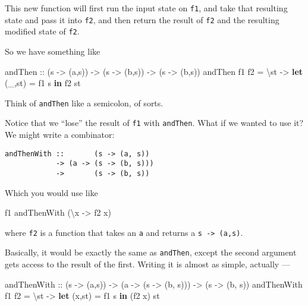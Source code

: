 \documentclass[]{article}
\newenvironment{Shaded}{}{}
\newcommand{\KeywordTok}[1]{\textcolor[rgb]{0.00,0.44,0.13}{\textbf{#1}}}
\newcommand{\NormalTok}[1]{#1}
\newcommand{\OtherTok}[1]{\textcolor[rgb]{0.00,0.44,0.13}{#1}}
\begin{document}
This new function will first run the input state on \texttt{f1}, and take that
resulting state and pass it into \texttt{f2}, and then return the result of
\texttt{f2} and the resulting modified state of \texttt{f2}.

So we have something like

\begin{Shaded}
\begin{Highlighting}[]
\OtherTok{andThen ::}\NormalTok{ (s }\OtherTok{{-}\textgreater{}}\NormalTok{ (a,s)) }\OtherTok{{-}\textgreater{}}\NormalTok{ (s }\OtherTok{{-}\textgreater{}}\NormalTok{ (b,s)) }\OtherTok{{-}\textgreater{}}\NormalTok{ (s }\OtherTok{{-}\textgreater{}}\NormalTok{ (b,s))}
\NormalTok{andThen f1 f2 }\OtherTok{=}\NormalTok{ \textbackslash{}st }\OtherTok{{-}\textgreater{}} \KeywordTok{let}\NormalTok{ (\_,st\textquotesingle{}) }\OtherTok{=}\NormalTok{ f1 s}
                       \KeywordTok{in}\NormalTok{  f2 st\textquotesingle{}}
\end{Highlighting}
\end{Shaded}

Think of \texttt{andThen} like a semicolon, of sorts.

Notice that we ``lose'' the result of \texttt{f1} with \texttt{andThen}. What if
we wanted to use it? We might write a combinator:

\begin{verbatim}
andThenWith ::       (s -> (a, s))
            -> (a -> (s -> (b, s)))
            ->       (s -> (b, s))
\end{verbatim}

Which you would use like

\begin{Shaded}
\begin{Highlighting}[]
\NormalTok{f1 }\OtherTok{\textasciigrave{}andThenWith\textasciigrave{}}\NormalTok{ (\textbackslash{}x }\OtherTok{{-}\textgreater{}}\NormalTok{ f2 x)}
\end{Highlighting}
\end{Shaded}

where \texttt{f2} is a function that takes an \texttt{a} and returns a
\texttt{s\ -\textgreater{}\ (a,s)}.

Basically, it would be exactly the same as \texttt{andThen}, except the second
argument gets access to the result of the first. Writing it is almost as simple,
actually ---

\begin{Shaded}
\begin{Highlighting}[]
\OtherTok{andThenWith ::}\NormalTok{ (s }\OtherTok{{-}\textgreater{}}\NormalTok{ (a,s)) }\OtherTok{{-}\textgreater{}}\NormalTok{ (a }\OtherTok{{-}\textgreater{}}\NormalTok{ (s }\OtherTok{{-}\textgreater{}}\NormalTok{ (b, s))) }\OtherTok{{-}\textgreater{}}\NormalTok{ (s }\OtherTok{{-}\textgreater{}}\NormalTok{ (b, s))}
\NormalTok{andThenWith f1 f2 }\OtherTok{=}\NormalTok{ \textbackslash{}st }\OtherTok{{-}\textgreater{}} \KeywordTok{let}\NormalTok{ (x,st\textquotesingle{}) }\OtherTok{=}\NormalTok{ f1 s}
                           \KeywordTok{in}\NormalTok{  (f2 x) st\textquotesingle{}}
\end{Highlighting}
\end{Shaded}
\end{document}
